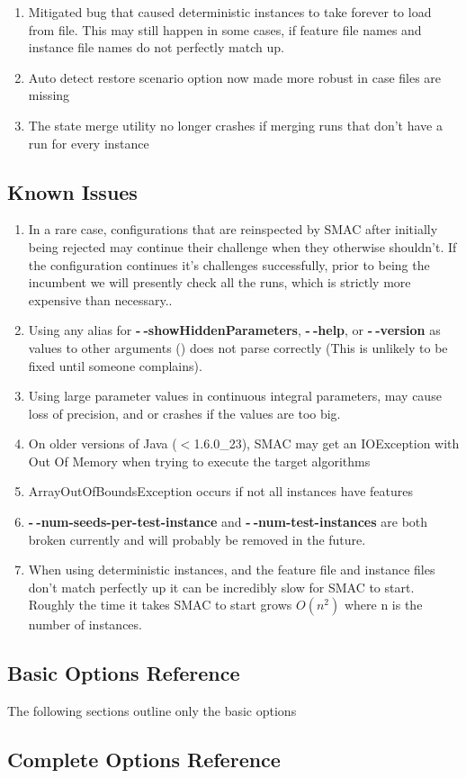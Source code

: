 \documentclass[11pt,letterpaper,oneside]{article}
\begin{document}
\begin{description}
\begin{enumerate}
          		\item Mitigated bug that caused deterministic instances to take forever to load from file. This may still happen in some cases, if feature file names and instance file names do not perfectly match up.
          		\item Auto detect restore scenario option now made more robust in case files are missing
          		\item The state merge utility no longer crashes if merging runs that don't have a run for every instance
          	\end{enumerate}
          	

	\end{description}
\subsection{Known Issues}
\label{known-issues}
\begin{enumerate}
\item In a rare case, configurations that are reinspected by SMAC after initially being rejected may continue their challenge when they otherwise shouldn't. If the configuration continues it's challenges successfully, prior to being the incumbent we will presently check all the runs, which is strictly more expensive than necessary..
\item Using any alias for \textbf{-$~\!$-showHiddenParameters}, \textbf{-$~\!$-help}, or \textbf{-$~\!$-version} as values to other arguments () does not parse correctly (This is unlikely to be fixed until someone complains).
\item Using large parameter values in continuous integral parameters, may cause loss of precision, and or crashes if the values are too big.
\item On older versions of Java ($<$1.6.0\_23), SMAC  may get an IOException with Out Of Memory when trying to execute the target algorithms

\item ArrayOutOfBoundsException occurs if not all instances have features
\item \textbf{-$~\!$-num-seeds-per-test-instance} and \textbf{-$~\!$-num-test-instances} are both broken currently and will probably be removed in the future.
\item When using deterministic instances, and the feature file and instance files don't match perfectly up it can be incredibly slow for SMAC to start. Roughly the time it takes SMAC to start grows $O(n^{2})$ where n is the number of instances.


\end{enumerate}

\clearpage


\subsection{Basic Options Reference}
The following sections outline only the basic options
\label{sec:options-basic-ref}



\clearpage

\subsection{Complete Options Reference}
\label{sec:options-ref}

\end{document}
